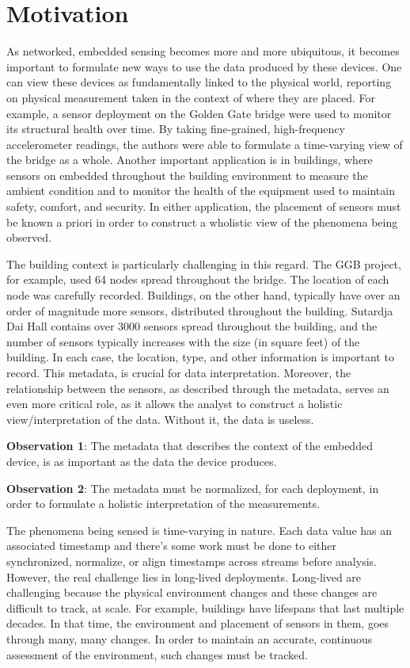 \section{Motivation}

As networked, embedded sensing becomes more and more ubiquitous, it becomes important to formulate new ways to use the data produced by these devices.  One can view these devices as fundamentally linked to the physical world, reporting on physical measurement taken in the context of where they are placed.  For example, a sensor deployment on the Golden Gate bridge \cite{GGB} were used to monitor its structural health over time.  By taking fine-grained, high-frequency accelerometer readings, the authors were able to formulate a time-varying view of the bridge as a whole.  Another important application is in buildings, where sensors on embedded throughout the building environment to measure the ambient condition and to monitor the health of the equipment used to maintain safety, comfort, and security.  In either application, the placement of sensors must be known a priori in order to construct a wholistic view of the phenomena being observed.

The building context is particularly challenging in this regard.  The GGB project, for example, used 64 nodes spread 
throughout the bridge.  The location of each node was carefully recorded.  Buildings, on the other hand, typically have 
over an order of magnitude more sensors, distributed throughout the building.  Sutardja Dai Hall contains over 3000 
sensors spread throughout the building, and the number of sensors typically increases with the size (in square feet) 
of the building.  In each case, the location, type, and other information is important to record.  This metadata, is 
crucial for data interpretation.  Moreover, the relationship between the sensors, as described through the metadata, 
serves an even more critical role, as it allows the analyst to construct a holistic view/interpretation of the data.  
Without it, the data is useless.

{\bf Observation 1}:  The metadata that describes the context of the embedded device, is as important as the data the 
device produces.

{\bf Observation 2}:  The metadata must be normalized, for each deployment, in order to formulate a holistic interpretation 
of the measurements.

The phenomena being sensed is time-varying in nature.  Each data value has an associated timestamp and there’s some work 
must be done to either synchronized, normalize, or align timestamps across streams before analysis.  However, the real 
challenge lies in long-lived deployments.  Long-lived are challenging because the physical environment changes and these 
changes are difficult to track, at scale.  For example, buildings have lifespans that last multiple decades.  In that 
time, the environment and placement of sensors in them, goes through many, many changes.  In order to maintain an accurate, 
continuous assessment of the environment, such changes must be tracked.

